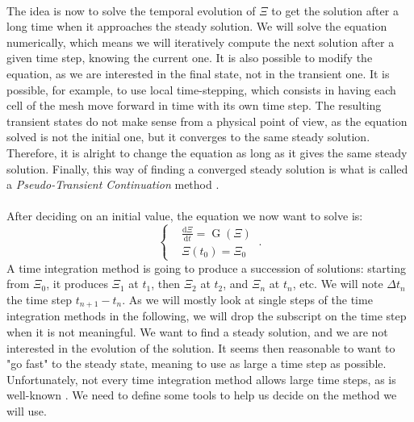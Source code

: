     \paragraph{}
    The idea is now to solve the temporal evolution of $\Xi$ to get the solution after a long time when it approaches the steady solution.
    We will solve the equation numerically, which means we will iteratively compute the next solution after a given time step, knowing the current one.
    It is also possible to modify the equation, as we are interested in the final state, not in the transient one.
    It is possible, for example, to use local time-stepping, which consists in having each cell of the mesh move forward in time with its own time step.
    The resulting transient states do not make sense from a physical point of view, as the equation solved is not the initial one, but it converges to the same steady solution.
    Therefore, it is alright to change the equation as long as it gives the same steady solution.
    Finally, this way of finding a converged steady solution is what is called a \emph{Pseudo-Transient Continuation} method \cite{KelleyKeyes1996}.

    \paragraph{}
    After deciding on an initial value, the equation we now want to solve is:
    \begin{equation}\label{eq:init_value_ode}
      \left\{\begin{aligned}
        & \frac{\mathrm{d} \Xi}{\mathrm{d}t} = \operatorname{G}\left(\Xi\right) \\
        & \Xi\left(t_0\right) = \Xi_0
      \end{aligned}\right. \ .
    \end{equation}
    A time integration method is going to produce a succession of solutions: starting from $\Xi_0$, it produces $\Xi_1$ at $t_1$, then $\Xi_2$ at $t_2$, and $\Xi_n$ at $t_n$, etc.
    We will note $\Delta t_n$ the time step $t_{n+1} - t_n$.
    As we will mostly look at single steps of the time integration methods in the following, we will drop the subscript on the time step when it is not meaningful.
    We want to find a steady solution, and we are not interested in the evolution of the solution.
    It seems then reasonable to want to "go fast" to the steady state, meaning to use as large a time step as possible.
    Unfortunately, not every time integration method allows large time steps, as is well-known \cite{CourantFriedrichsLewy1967}.
    We need to define some tools to help us decide on the method we will use.


